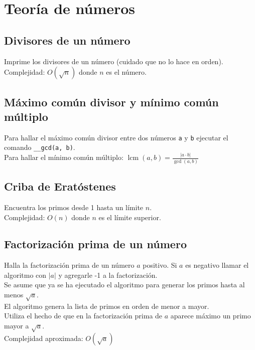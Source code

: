 \documentclass[10pt,letterpaper,twocolumn]{article}
\newcommand{\source}[1]{
	
	\dotfill
}
\begin{document}
\section{Teoría de números}
	\subsection{Divisores de un número}
	Imprime los divisores de un número (cuidado que no lo hace en orden).\\
	Complejidad: $O(\sqrt{n})$ donde $n$ es el número.\\
	\source{./src/divisors.cpp}
	
	\subsection{Máximo común divisor y mínimo común múltiplo}
	Para hallar el máximo común divisor entre dos números \verb|a| y \verb|b| ejecutar el comando \verb|__gcd(a, b)|.\\
	Para hallar el mínimo común múltiplo: \quad $ \displaystyle\operatorname{lcm}(a, b) = \frac{|a \cdot b|}{\operatorname{gcd}(a,b)}$
	
	\subsection{Criba de Eratóstenes}
	Encuentra los primos desde 1 hasta un límite $n$.\\
	Complejidad: $O(n)$ donde $n$ es el límite superior.\\
	\source{./src/sieve.cpp}
	
	\subsection{Factorización prima de un número}
	Halla la factorización prima de un número $a$ positivo. Si $a$ es negativo llamar el algoritmo con $|a|$ y agregarle -1 a la factorización.\\
	Se asume que ya se ha ejecutado el algoritmo para generar los primos hasta al menos $\sqrt{a}$.\\
	El algoritmo genera la lista de primos en orden de menor a mayor.\\
	Utiliza el hecho de que en la factorización prima de $a$ aparece máximo un primo mayor a $\sqrt{a}$.\\
	Complejidad aproximada: $O(\sqrt{a})$\\
	\source{./src/factorization.cpp}
	
\end{document}
